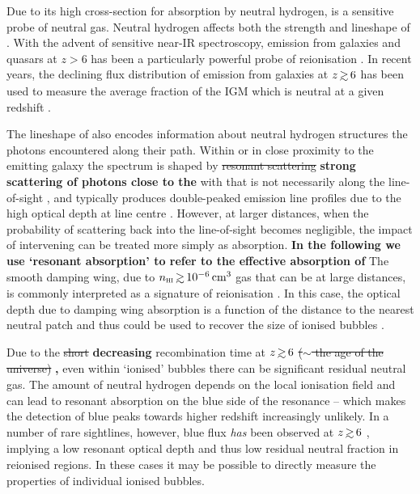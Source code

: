 \documentclass[fleqn,usenatbib]{mnras}
\providecommand{\DIFadd}[1]{{\protect\color{Green} {\bf #1}}} %
\providecommand{\DIFdel}[1]{{\protect\color{Gray} \scriptsize \sout{#1}}} %
\providecommand{\DIFaddbegin}{} %
\providecommand{\DIFaddend}{} %
\providecommand{\DIFdelbegin}{} %
\providecommand{\DIFdelend}{} %
\newcommand{\DIFscaledelfig}{0.5}
\newlength{\DIFdelgraphicswidth} %
\newlength{\DIFdelgraphicsheight} %
\newcommand{\DIFaddincludegraphics}[2][]{{\color{purple}\fbox{\DIFOincludegraphics[#1]{#2}}}} %
\newcommand{\DIFdelincludegraphics}[2][]{%
\sbox{\DIFdelgraphicsbox}{\DIFOincludegraphics[#1]{#2}}%
\settoboxwidth{\DIFdelgraphicswidth}{\DIFdelgraphicsbox} %
\settoboxtotalheight{\DIFdelgraphicsheight}{\DIFdelgraphicsbox} %
\scalebox{\DIFscaledelfig}{%
\parbox[b]{\DIFdelgraphicswidth}{\usebox{\DIFdelgraphicsbox}\\[-\baselineskip] \rule{\DIFdelgraphicswidth}{0em}}\llap{\resizebox{\DIFdelgraphicswidth}{\DIFdelgraphicsheight}{%
\setlength{\unitlength}{\DIFdelgraphicswidth}%
\begin{picture}(1,1)%
\thicklines\linethickness{2pt} %
{\color[rgb]{1,0,0}\put(0,0){\framebox(1,1){}}}%
{\color[rgb]{1,0,0}\put(0,0){\line( 1,1){1}}}%
{\color[rgb]{1,0,0}\put(0,1){\line(1,-1){1}}}%
\end{picture}%
}\hspace*{3pt}}} %
} %
\DeclareRobustCommand{\DIFaddbegin}{\DIFOaddbegin \let\includegraphics\DIFaddincludegraphics} %
\DeclareRobustCommand{\DIFaddend}{\DIFOaddend \let\includegraphics\DIFOincludegraphics} %
\DeclareRobustCommand{\DIFdelbegin}{\DIFOdelbegin \let\includegraphics\DIFdelincludegraphics} %
\DeclareRobustCommand{\DIFdelend}{\DIFOaddend \let\includegraphics\DIFOincludegraphics} %
\begin{document}
Due to its high cross-section for absorption by neutral hydrogen, \lya is a sensitive probe of neutral gas. Neutral hydrogen affects both the strength and lineshape of \lya \citep[see, e.g.,][for a review]{Dijkstra2014}. With the advent of sensitive near-IR spectroscopy, \lya emission from galaxies and quasars at $z>6$ has been a particularly powerful probe of reionisation \citep[e.g.,][]{Malhotra2006,Fan2006,Dijkstra2011,Treu2013,Mesinger2015,Davies2018b,Mason2018,Greig2019}. In recent years, the declining flux distribution of \lya emission from galaxies at $z\simgt6$ has been used to measure the average fraction of the IGM which is neutral at a given redshift \citep{Schenker2014,Mason2018,Mason2019a,Hoag2019a,Whitler2019}.

The lineshape of \lya also encodes information about neutral hydrogen structures the photons encountered along their path. Within or in close proximity to the emitting galaxy the \lya spectrum is shaped by \DIFdelbegin \DIFdel{resonant scattering }\DIFdelend \DIFaddbegin \DIFadd{strong scattering of photons close to the }\lya\DIFadd{\ resonant wavelength (resonant scattering) }\DIFaddend with \HI that is not necessarily along the line-of-sight \citep{Eide2018}, and typically produces double-peaked emission line profiles due to the high optical depth at line centre \citep[e.g.,][]{Neufeld1990}. However, at larger distances, when the probability of scattering back into the line-of-sight becomes negligible, the impact of intervening \HI can be treated more simply as absorption. \DIFaddbegin \DIFadd{In the following we use `resonant absorption' to refer to the effective absorption of }\lya\DIFadd{\ photons which emerge from galaxies with a blueshift, but encounter significant neutral gas as they redshift into the resonant wavelength.
}\DIFaddend The smooth damping wing, due to $n_{\HI} \simgt 10^{-6} \cm^3$ gas that can be at large distances, is commonly interpreted as a signature of reionisation \citep[ e.g.,][]{Miralda-Escude1998}. In this case, the optical depth due to damping wing absorption is a function of the distance to the nearest neutral patch and thus could be used to recover the size of ionised bubbles \citep{Malhotra2006}. 

Due to the \DIFdelbegin \DIFdel{short }\DIFdelend \DIFaddbegin \DIFadd{decreasing }\DIFaddend recombination time at $z\simgt6$\DIFdelbegin \DIFdel{($\sim$ the age of the universe) }\DIFdelend \DIFaddbegin \DIFadd{, }\DIFaddend even within `ionised' bubbles there can be significant residual neutral gas. The amount of neutral hydrogen  depends on the local ionisation field and can lead to resonant absorption on the blue side of the \lya resonance \DIFdelbegin %
\DIFdelend \DIFaddbegin \citep[e.g.,][]{Gunn1965,Zheng2010,Laursen2011,Byrohl2020} \DIFaddend -- which makes the detection of blue \lya peaks towards higher redshift increasingly unlikely. In a number of rare sightlines, however, blue \lya flux \textit{has} been observed at $z\simgt6$ \citep{Matthee2018b,Songaila2018,Bosman2019}, implying a low resonant optical depth and thus low residual neutral fraction in reionised regions. In these cases it may be possible to directly measure the properties of individual ionised bubbles.
\end{document}

